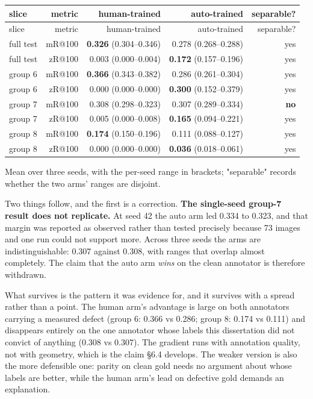 \begin{center}
\small
\begin{longtable}{lrrrr}
\hline
slice & metric & human-trained & auto-trained & separable? \\
\hline
\endfirsthead
\hline
slice & metric & human-trained & auto-trained & separable? \\
\hline
\endhead
full test & mR@100 & \textbf{0.326} (0.304--0.346) & 0.278 (0.268--0.288) & yes \\
full test & zR@100 & 0.003 (0.000--0.004) & \textbf{0.172} (0.157--0.196) & yes \\
group 6 & mR@100 & \textbf{0.366} (0.343--0.382) & 0.286 (0.261--0.304) & yes \\
group 6 & zR@100 & 0.000 (0.000--0.000) & \textbf{0.300} (0.152--0.379) & yes \\
group 7 & mR@100 & 0.308 (0.298--0.323) & 0.307 (0.289--0.334) & \textbf{no} \\
group 7 & zR@100 & 0.005 (0.000--0.008) & \textbf{0.165} (0.094--0.221) & yes \\
group 8 & mR@100 & \textbf{0.174} (0.150--0.196) & 0.111 (0.088--0.127) & yes \\
group 8 & zR@100 & 0.000 (0.000--0.000) & \textbf{0.036} (0.018--0.061) & yes \\
\hline
\end{longtable}
\end{center}

Mean over three seeds, with the per-seed range in brackets; "separable" records whether the two arms' ranges are disjoint.

Two things follow, and the first is a correction. \textbf{The single-seed group-7 result does not replicate.} At seed 42 the auto arm led 0.334 to 0.323, and that margin was reported as observed rather than tested precisely because 73 images and one run could not support more. Across three seeds the arms are indistinguishable: 0.307 against 0.308, with ranges that overlap almost completely. The claim that the auto arm \textit{wins} on the clean annotator is therefore withdrawn.

What survives is the pattern it was evidence for, and it survives with a spread rather than a point. The human arm's advantage is large on both annotators carrying a measured defect (group 6: 0.366 vs 0.286; group 8: 0.174 vs 0.111) and disappears entirely on the one annotator whose labels this dissertation did not convict of anything (0.308 vs 0.307). The gradient runs with annotation quality, not with geometry, which is the claim \S6.4 develops. The weaker version is also the more defensible one: parity on clean gold needs no argument about whose labels are better, while the human arm's lead on defective gold demands an explanation.

